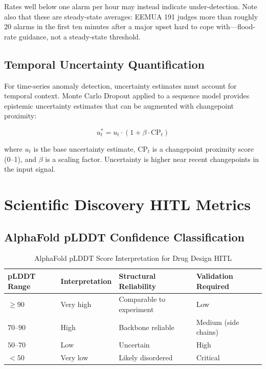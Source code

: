 Rates well below one alarm per hour may instead indicate under-detection. Note also that these are steady-state averages: EEMUA 191 judges more than roughly 20 alarms in the first ten minutes after a major upset hard to cope with---flood-rate guidance, not a steady-state threshold.

\subsection{Temporal Uncertainty Quantification}

For time-series anomaly detection, uncertainty estimates must account for temporal context. Monte Carlo Dropout applied to a sequence model provides epistemic uncertainty estimates that can be augmented with changepoint proximity:

\begin{equation}
u_t^* = u_t \cdot (1 + \beta \cdot \text{CP}_t)
\label{eq:temporal-uncertainty}
\end{equation}

where $u_t$ is the base uncertainty estimate, $\text{CP}_t$ is a changepoint proximity score (0--1), and $\beta$ is a scaling factor. Uncertainty is higher near recent changepoints in the input signal.

\section{Scientific Discovery HITL Metrics}

\subsection{AlphaFold pLDDT Confidence Classification}

\begin{table}[h]
\centering
\caption{AlphaFold pLDDT Score Interpretation for Drug Design HITL}
\label{tab:plddt}
\begin{tabularx}{\textwidth}{@{}lYYY@{}}
\toprule
\textbf{pLDDT Range} & \textbf{Interpretation} & \textbf{Structural Reliability} & \textbf{Validation Required} \\
\midrule
$\geq 90$ & Very high & Comparable to experiment & Low \\
$70$--$90$ & High & Backbone reliable & Medium (side chains) \\
$50$--$70$ & Low & Uncertain & High \\
$< 50$ & Very low & Likely disordered & Critical \\
\bottomrule
\end{tabularx}
\end{table}

